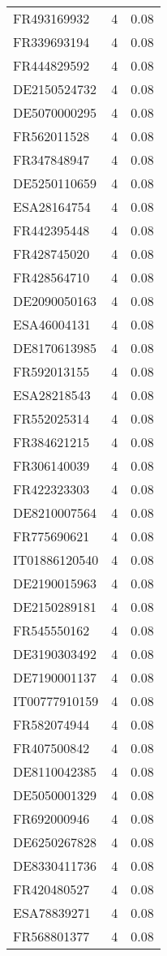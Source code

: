 \begin{table*}[htbp]
\begin{tabular}{lrr}
FR493169932 & 4 & 0.08 \\
FR339693194 & 4 & 0.08 \\
FR444829592 & 4 & 0.08 \\
DE2150524732 & 4 & 0.08 \\
DE5070000295 & 4 & 0.08 \\
FR562011528 & 4 & 0.08 \\
FR347848947 & 4 & 0.08 \\
DE5250110659 & 4 & 0.08 \\
ESA28164754 & 4 & 0.08 \\
FR442395448 & 4 & 0.08 \\
FR428745020 & 4 & 0.08 \\
FR428564710 & 4 & 0.08 \\
DE2090050163 & 4 & 0.08 \\
ESA46004131 & 4 & 0.08 \\
DE8170613985 & 4 & 0.08 \\
FR592013155 & 4 & 0.08 \\
ESA28218543 & 4 & 0.08 \\
FR552025314 & 4 & 0.08 \\
FR384621215 & 4 & 0.08 \\
FR306140039 & 4 & 0.08 \\
FR422323303 & 4 & 0.08 \\
DE8210007564 & 4 & 0.08 \\
FR775690621 & 4 & 0.08 \\
IT01886120540 & 4 & 0.08 \\
DE2190015963 & 4 & 0.08 \\
DE2150289181 & 4 & 0.08 \\
FR545550162 & 4 & 0.08 \\
DE3190303492 & 4 & 0.08 \\
DE7190001137 & 4 & 0.08 \\
IT00777910159 & 4 & 0.08 \\
FR582074944 & 4 & 0.08 \\
FR407500842 & 4 & 0.08 \\
DE8110042385 & 4 & 0.08 \\
DE5050001329 & 4 & 0.08 \\
FR692000946 & 4 & 0.08 \\
DE6250267828 & 4 & 0.08 \\
DE8330411736 & 4 & 0.08 \\
FR420480527 & 4 & 0.08 \\
ESA78839271 & 4 & 0.08 \\
FR568801377 & 4 & 0.08 \\

\end{tabular}
\end{table*}
